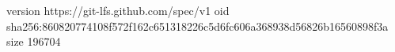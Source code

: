 version https://git-lfs.github.com/spec/v1
oid sha256:860820774108f572f162c651318226c5d6fc606a368938d56826b16560898f3a
size 196704
